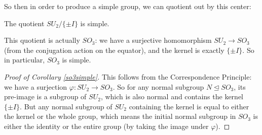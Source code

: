 So then in order to produce a simple group, we can quotient out by this center:

\begin{corollary}\label{so3simple}
    The quotient $SU_2/\{\pm I\}$ is simple. 
\end{corollary}

This quotient is actually $SO_3$: we have a surjective homomorphism $SU_2 \to SO_3$ (from the conjugation action on the equator), and the kernel is exactly $\{\pm I\}$. So in particular, $SO_3$ is simple. 

\begin{proof}[Proof of Corollary \ref{so3simple}]
    This follows from the Correspondence Principle: we have a surjection $\varphi : SU_2 \to SO_3$. So for any normal subgroup $N \trianglelefteq SO_3$, its pre-image is a subgroup of $SU_2$, which is also normal and contains the kernel $\{\pm I\}$. But any normal subgroup of $SU_2$ containing the kernel is equal to either the kernel or the whole group, which means the initial normal subgroup in $SO_3$ is either the identity or the entire group (by taking the image under $\varphi$). 
\end{proof}

